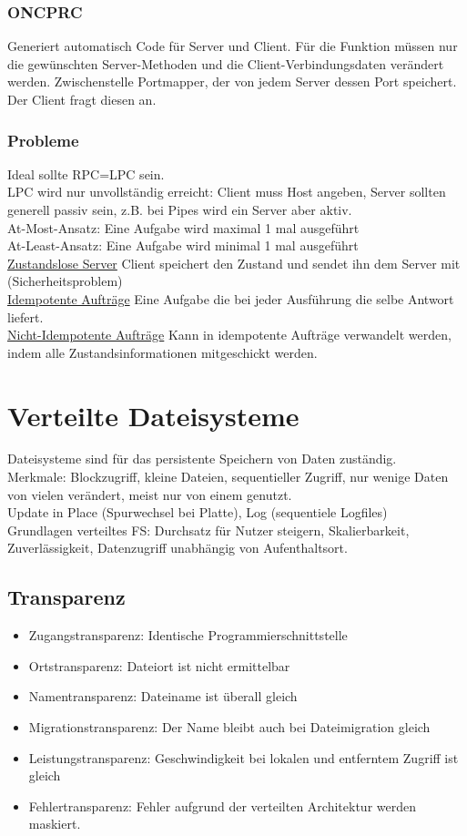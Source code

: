 \documentclass[a4paper]{article}
\begin{document}
\subsubsection{ONCPRC}
Generiert automatisch Code für Server und Client. Für die Funktion müssen nur die gewünschten Server-Methoden und die Client-Verbindungsdaten verändert werden. Zwischenstelle Portmapper, der von jedem Server dessen Port speichert. Der Client fragt diesen an.
\subsubsection{Probleme}
Ideal sollte RPC=LPC sein.\\
LPC wird nur unvollständig erreicht: Client muss Host angeben, Server sollten generell passiv sein, z.B. bei Pipes wird ein Server aber aktiv.\\
At-Most-Ansatz: Eine Aufgabe wird maximal 1 mal ausgeführt\\
At-Least-Ansatz: Eine Aufgabe wird minimal 1 mal ausgeführt\\
\underline{Zustandslose Server}
Client speichert den Zustand und sendet ihn dem Server mit (Sicherheitsproblem)\\
\underline{Idempotente Aufträge}
Eine Aufgabe die bei jeder Ausführung die selbe Antwort liefert.\\
\underline{Nicht-Idempotente Aufträge}
Kann in idempotente Aufträge verwandelt werden, indem alle Zustandsinformationen mitgeschickt werden.
\section{Verteilte Dateisysteme}
Dateisysteme sind für das persistente Speichern von Daten zuständig.\\
Merkmale: Blockzugriff, kleine Dateien, sequentieller Zugriff, nur wenige Daten von vielen verändert, meist nur von einem genutzt.\\
Update in Place (Spurwechsel bei Platte), Log (sequentiele Logfiles)\\
Grundlagen verteiltes FS: Durchsatz für Nutzer steigern, Skalierbarkeit, Zuverlässigkeit, Datenzugriff unabhängig von Aufenthaltsort.\\
\subsection{Transparenz}
\begin{itemize}
\item Zugangstransparenz: Identische Programmierschnittstelle
\item Ortstransparenz: Dateiort ist nicht ermittelbar
\item Namentransparenz: Dateiname ist überall gleich
\item Migrationstransparenz: Der Name bleibt auch bei Dateimigration gleich
\item Leistungstransparenz: Geschwindigkeit bei lokalen und entferntem Zugriff ist gleich
\item Fehlertransparenz: Fehler aufgrund der verteilten Architektur werden maskiert.
\end{itemize}
\end{document}
